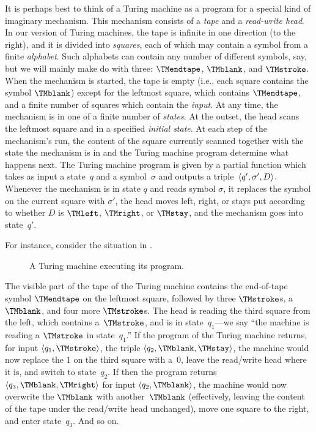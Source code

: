 \documentclass[../../../include/open-logic-section]{subfiles}
\begin{document}
\begin{explain}
It is perhaps best to think of a Turing
machine as a program for a special kind of imaginary mechanism. This
mechanism consists of a \emph{tape} and a \emph{read-write head}. In
our version of Turing machines, the tape is infinite in one direction
(to the right), and it is divided into \emph{squares}, each of which
may contain a symbol from a finite \emph{alphabet}. Such alphabets can
contain any number of different symbols, say, but we will mainly make do
with three: $\TMendtape$, $\TMblank$, and $\TMstroke$. When the
mechanism is started, the tape is empty (i.e., each square contains
the symbol $\TMblank$) except for the leftmost square, which contains
$\TMendtape$, and a finite number of squares which contain the
\emph{input}. At any time, the mechanism is in one of a finite number
of \emph{states}. At the outset, the head scans the leftmost square
and in a specified \emph{initial state}. At each step of the
mechanism's run, the content of the square currently scanned together
with the state the mechanism is in and the Turing machine program
determine what happens next. The Turing machine program is given by a
partial function which takes as input a state~$q$ and a
symbol~$\sigma$ and outputs a triple~$\langle q', \sigma',
  D \rangle$. Whenever the mechanism is in state $q$ and reads symbol
$\sigma$, it replaces the symbol on the current square with $\sigma'$,
the head moves left, right, or stays put according to whether $D$ is
$\TMleft$, $\TMright$, or $\TMstay$, and the mechanism goes into
state~$q'$.

For instance, consider the situation in .
\begin{figure}
  \caption{A Turing machine executing its program.}
\end{figure}
The visible part of the tape of the Turing machine contains the
end-of-tape symbol $\TMendtape$ on the leftmost square, followed by
three $\TMstroke$s, a $\TMblank$, and four more $\TMstroke$s.  The head is reading the
third square from the left, which contains a~$\TMstroke$, and is in
state~$q_1$---we say ``the machine is reading a $\TMstroke$ in state~$q_1$.''
If the program of the Turing machine returns, for input $\tuple{q_1,
  \TMstroke}$, the triple $\tuple{q_2, \TMblank, \TMstay}$, the machine would now
replace the $1$ on the third square with a~$0$, leave the read/write
head where it is, and switch to state~$q_2$.  If then the program
returns $\tuple{q_3, \TMblank, \TMright}$ for input $\tuple{q_2, \TMblank}$, the
machine would now overwrite the $\TMblank$ with another~$\TMblank$ (effectively,
leaving the content of the tape under the read/write head unchanged),
move one square to the right, and enter state~$q_3$. And so on.


\end{explain}
\end{document}
